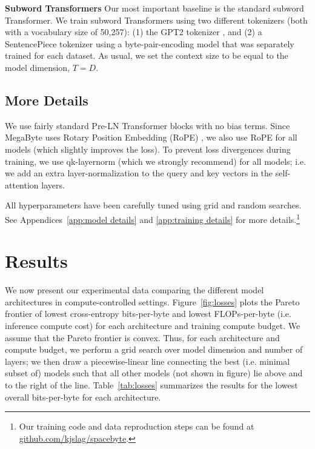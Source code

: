 \textbf{Subword Transformers} Our most important baseline is the standard subword Transformer. We train subword Transformers using two different tokenizers (both with a vocabulary size of 50,257): (1) the GPT2 tokenizer \cite{radford2019gpt2}, and (2) a SentencePiece \cite{kudo2018sentencepiece} tokenizer using a byte-pair-encoding model \cite{sennrich2016bpe} that was separately trained for each dataset. As usual, we set the context size to be equal to the model dimension, $T = D$.

\subsection{More Details}
\label{sec:model setup details}

We use fairly standard Pre-LN \cite{baevski2018adaptive,child2019sparse,wang2019preln} Transformer \cite{vaswani2017attention} blocks with no bias terms. Since MegaByte uses Rotary Position Embedding (RoPE) \cite{su2021roformer}, we also use RoPE for all models (which slightly improves the loss). To prevent loss divergences during training, we use qk-layernorm \cite{henry2020qknorm,dehghani2023scaling,wortsman2024smallscale} (which we strongly recommend) for all models; i.e. we add an extra layer-normalization to the query and key vectors in the self-attention layers.

All hyperparameters have been carefully tuned using grid and random searches. See Appendices~\ref{app:model details} and \ref{app:training details} for more details.\footnote{
  Our training code and data reproduction steps can be found at \href{https://github.com/kjslag/spacebyte}{github.com/kjslag/spacebyte}.}

\section{Results}
\label{sec:results}

We now present our experimental data comparing the different model architectures in compute-controlled settings.
Figure~\ref{fig:losses} plots the Pareto frontier of lowest cross-entropy bits-per-byte and lowest FLOPs-per-byte (i.e. inference compute cost) for each architecture and training compute budget. We assume that the Pareto frontier is convex. Thus, for each architecture and compute budget, we perform a grid search over model dimension and number of layers; we then draw a piecewise-linear line connecting the best (i.e. minimal subset of) models such that all other models (not shown in figure) lie above and to the right of the line.
Table~\ref{tab:losses} summarizes the results for the lowest overall bits-per-byte for each architecture.

